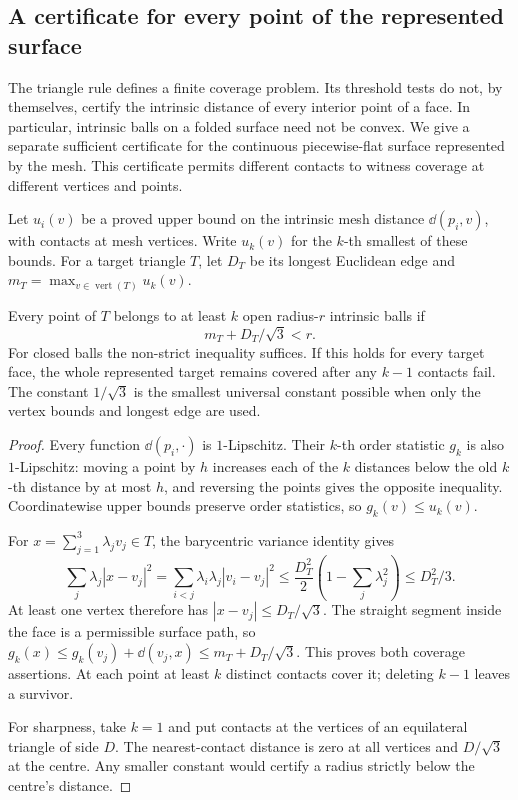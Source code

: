 \subsection*{A certificate for every point of the represented surface}
\label{sec:continuouscertificate}

The triangle rule defines a finite coverage problem. Its threshold tests do
not, by themselves, certify the intrinsic distance of every interior point
of a face. In particular, intrinsic balls on a folded surface need not be
convex. We give a separate sufficient certificate for the continuous
piecewise-flat surface represented by the mesh. This certificate permits
different contacts to witness coverage at different vertices and points.

Let $u_i(v)$ be a proved upper bound on the intrinsic mesh distance
$\dd(p_i,v)$, with contacts at mesh vertices. Write $u_k(v)$ for the $k$-th
smallest of these bounds. For a target triangle $T$, let $D_T$ be its longest
Euclidean edge and $m_T=\max_{v\in\operatorname{vert}(T)}u_k(v)$.

\begin{theorem}\label{thm:wholeface}
Every point of $T$ belongs to at least $k$ open radius-$r$ intrinsic balls if
\[
                 m_T+D_T/\sqrt3<r.
\]
For closed balls the non-strict inequality suffices. If this holds for every
target face, the whole represented target remains covered after any $k-1$
contacts fail. The constant $1/\sqrt3$ is the smallest universal constant
possible when only the vertex bounds and longest edge are used.
\end{theorem}

\begin{proof}
Every function $\dd(p_i,\cdot)$ is $1$-Lipschitz. Their $k$-th order statistic
$g_k$ is also $1$-Lipschitz: moving a point by $h$ increases each of the $k$
distances below the old $k$-th distance by at most $h$, and reversing the
points gives the opposite inequality. Coordinatewise upper bounds preserve
order statistics, so $g_k(v)\le u_k(v)$.

For $x=\sum_{j=1}^3\lambda_jv_j\in T$, the barycentric variance identity gives
\[
 \sum_j\lambda_j|x-v_j|^2
 =\sum_{i<j}\lambda_i\lambda_j|v_i-v_j|^2
 \le\frac{D_T^2}2\left(1-\sum_j\lambda_j^2\right)
 \le D_T^2/3.
\]
At least one vertex therefore has $|x-v_j|\le D_T/\sqrt3$. The straight
segment inside the face is a permissible surface path, so
$g_k(x)\le g_k(v_j)+\dd(v_j,x)\le m_T+D_T/\sqrt3$.
This proves both coverage assertions. At each point at least $k$ distinct
contacts cover it; deleting $k-1$ leaves a survivor.

For sharpness, take $k=1$ and put contacts at the vertices of an equilateral
triangle of side $D$. The nearest-contact distance is zero at all vertices
and $D/\sqrt3$ at the centre. Any smaller constant would certify a radius
strictly below the centre's distance.
\end{proof}

